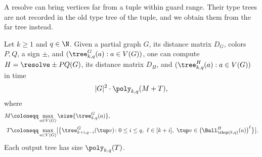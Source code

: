 A resolve can bring vertices far from a tuple within guard range.
Their type trees are not recorded in the old type tree of the tuple, and we obtain them from the far tree instead.

\begin{lemma}\label{lem:resolve-lift}
Let $k\ge1$ and $q\in\N$.
Given a partial graph $G$, its distance matrix $D_G$, colors $P,Q$,
a sign $\pm$, and
$(\tree^G_{k,q}(a):a\in V(G))$, one can compute
$H=\resolve\pm PQ(G)$, its distance matrix $D_H$, and
$(\tree^{H}_{k,q}(a):a\in V(G))$ in time
\[
|G|^2\cdot\poly_{k,q}(M+T),
\]
where
\begin{align*}
M&\coloneqq\max_{a\in V(G)}\size{\tree^G_{k,q}(a)},\\
T&\coloneqq\max_{a\in V(G)}\bigl|\bigl\{\tree^G_{k+i,q-i}(\tup v)\colon 0\le i\le q,\ \ell\in[k+i],\ \tup v\in\bigl(\Ball^{H}_{\rhop(k,q)}(a)\bigr)^{\ell}\bigr\}\bigr|.
\end{align*}
Each output tree has size $\poly_{k,q}(T)$.
\end{lemma}
